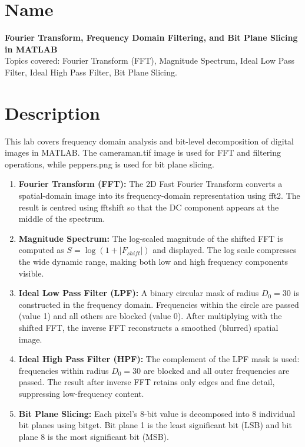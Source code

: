 \documentclass[12pt,a4paper]{article}
\begin{document}

\section{Name}

\textbf{Fourier Transform, Frequency Domain Filtering, and Bit Plane Slicing in MATLAB}\\[0.3em]
Topics covered: Fourier Transform (FFT), Magnitude Spectrum, Ideal Low Pass Filter,
Ideal High Pass Filter, Bit Plane Slicing.


\section{Description}

This lab covers frequency domain analysis and bit-level decomposition of digital
images in MATLAB. The cameraman.tif image is used for FFT and filtering operations,
while peppers.png is used for bit plane slicing.

\begin{enumerate}
  \item \textbf{Fourier Transform (FFT):} The 2D Fast Fourier Transform converts
        a spatial-domain image into its frequency-domain representation using
        fft2. The result is centred using fftshift so that the DC component
        appears at the middle of the spectrum.

  \item \textbf{Magnitude Spectrum:} The log-scaled magnitude of the shifted
        FFT is computed as $S = \log(1 + |F_{shift}|)$ and displayed. The
        log scale compresses the wide dynamic range, making both low and high
        frequency components visible.

  \item \textbf{Ideal Low Pass Filter (LPF):} A binary circular mask of radius
        $D_0 = 30$ is constructed in the frequency domain. Frequencies within
        the circle are passed (value 1) and all others are blocked (value 0).
        After multiplying with the shifted FFT, the inverse FFT reconstructs a
        smoothed (blurred) spatial image.

  \item \textbf{Ideal High Pass Filter (HPF):} The complement of the LPF mask
        is used: frequencies within radius $D_0 = 30$ are blocked and all
        outer frequencies are passed. The result after inverse FFT retains
        only edges and fine detail, suppressing low-frequency content.

  \item \textbf{Bit Plane Slicing:} Each pixel's 8-bit value is decomposed into
        8 individual bit planes using bitget. Bit plane 1 is the least
        significant bit (LSB) and bit plane 8 is the most significant bit (MSB).
\end{enumerate}
\end{document}
